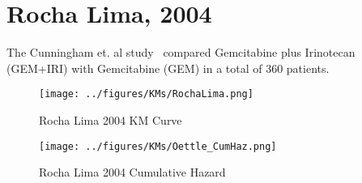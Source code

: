 \newpage

\section{Rocha Lima, 2004}
The Cunningham et. al study~\cite{rocha2004} compared Gemcitabine plus Irinotecan (GEM+IRI) with Gemcitabine (GEM) in a total of 360 patients. 

\begin{figure}
    \center
    \texttt{[image: ../figures/KMs/RochaLima.png]}
    \caption{Rocha Lima 2004 KM Curve}
    \label{rl2004km}
\end{figure}

\begin{figure}
    \center
    \texttt{[image: ../figures/KMs/Oettle\_CumHaz.png]}
    \caption{Rocha Lima 2004 Cumulative Hazard}
    \label{rl2004ch}
\end{figure}
